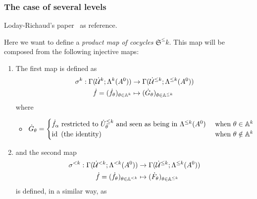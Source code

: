 \subsubsection{The case of several levels}
Loday-Richaud's paper~\cite{Loday1994} as reference.
\begin{defn}
  Here we want to define a \emph{product map of cocycles}
  $\mathfrak{S}^\leq k$.
  This map will be composed from the following injective maps:
  \begin{enumerate}
    \item The first map is defined as
      \begin{align*}
        \sigma^k:\Gamma(\dot{\mathcal{U}}^k;\Lambda^k(A^0))
        &\to \Gamma(\dot{\mathcal{U}}^{\leq k};\Lambda^{\leq k}(A^0))
      \\\dot f=(\dot f_\theta)_{\theta\in\mathbb{A}^k}
        &\mapsto (\dot G_\theta)_{\theta\in\mathbb{A}^{\leq k}}
      \end{align*}
      where
      \begin{itemize}
        \item $\dot G_\theta=\begin{cases}
            \dot f_\alpha \text{~restricted to } \dot U_\theta^{\leq k}
            \text{~and seen as being in } \Lambda^{\leq k}(A^0)
            & \text{~when } \theta\in\mathbb{A}^k
          \\\operatorname{id} \text{~(the identity) }
            & \text{~when } \theta\notin\mathbb{A}^k
          \end{cases}$
      \end{itemize}
    \item and the second map
      \begin{align*}
        \sigma^{<k}:\Gamma(\dot{\mathcal{U}}^{<k};\Lambda^{<k}(A^0))
        &\to \Gamma(\dot{\mathcal{U}}^{\leq k};\Lambda^{\leq k}(A^0))
      \\\dot f=(\dot f_\theta)_{\theta\in\mathbb{A}^{<k}}
        &\mapsto (\dot F_\theta)_{\theta\in\mathbb{A}^{\leq k}}
      \end{align*}
      is defined, in a similar way, as
\end{enumerate}
\end{defn}
